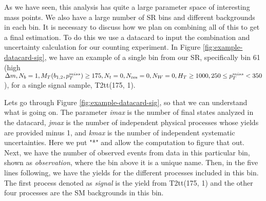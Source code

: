 As we have seen, this analysis has quite a large parameter space of interesting mass points. We also have a large number of SR bins and different backgrounds in each bin. It is necessary to discuss how we plan on combining all of this to get a final estimation. To do this we use a datacard to input the combination and uncertainty calculation for our counting experiment. In Figure \ref{fig:example-datacard-sig}, we have an example of a single bin from our SR, specifically bin 61 (high $\Delta m, N_{b}=1, M_{T}(b_{1,2},p_{T}^{miss})\geq175, N_{t}=0, N_{\text{res}}=0, N_{W}=0, H_{T}\geq1000, 250\leq p_{T}^{miss}<350$), for a single signal sample, T2tt(175, 1). 

Lets go through Figure \ref{fig:example-datacard-sig}, so that we can understand what is going on. The parameter \textit{imax} is the number of final states analyzed in the datacard, \textit{jmax} is the number of independent physical processes whose yields are provided minus 1, and \textit{kmax} is the number of independent systematic uncertainties. Here we put "*" and allow the computation to figure that out. Next, we have the number of observed events from data in this particular bin, shown as \textit{observation}, where the bin above it is a unique name. Then, in the five lines following, we have the yields for the different processes included in this bin. The first process denoted as \textit{signal} is the yield from T2tt(175, 1) and the other four processes are the SM backgrounds in this bin. 

